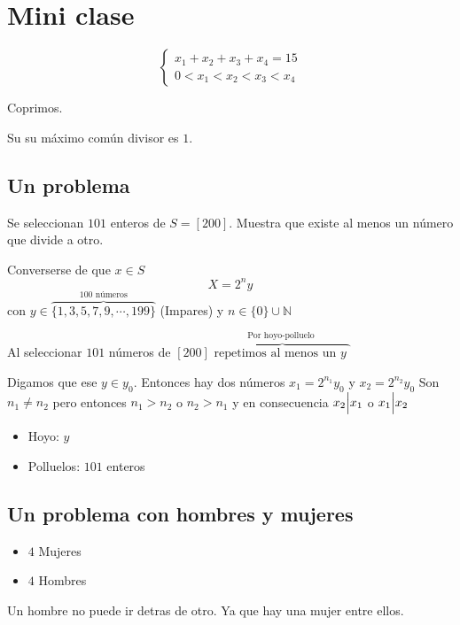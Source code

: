 \documentclass[../main.tex]{subfiles}
\begin{document}
\chapter{Mini clase}%

\thispagestyle{fancy}

\[
	\begin{cases}
		x_1+x_2+x_3+x_4=15\\
		0 < x_1 < x_2 < x_3 < x_4
	\end{cases}
\]

Coprimos.

Su su máximo común divisor es $1$.

\section{Un problema}%
\label{sec:un_problema}

Se seleccionan $101$ enteros de $S=[200]$.
Muestra que existe al menos un número que divide a otro.

Converserse de que $x\in S$
{
	\Huge
	\[
		X=2^ny
	\]
}
con
$
	y\in
	\overbrace
	{
		\{1,3,5,7,9,\cdots,199\}
	}^
	{
		\text{$100$ números}
	}
$
(Impares)
y $n\in\{0\}\cup\mathbb{N}$

Al seleccionar $101$ números de $[200]$
$
\overbrace
{
	\text
	{
		repetimos al menos un $y$
	}
}^
{
	\text
	{
		Por hoyo-polluelo
	}
}
$

Digamos que ese $y\in y_0$.
Entonces hay dos números $x_1=2^{n_1}y_0$ y
$x_2=2^{n_2}y_0$
Son $n_1\neq n_2$ pero entonces $n_1 > n_2$ o $n_2 > n_1$
y en consecuencia
$x_2 \Big{|} x_1$ o
$x_1 \Big{|} x_2$

\begin{itemize}
	\item Hoyo: $y$
	\item Polluelos: $101$ enteros
\end{itemize}

\section{Un problema con hombres y mujeres}%
\label{sec:un_problema_con_hombres_y_mujeres}

\begin{itemize}
	\item $4$ Mujeres
	\item $4$ Hombres
\end{itemize}

Un hombre no puede ir detras de otro.
Ya que hay una mujer entre ellos.
\end{document}
